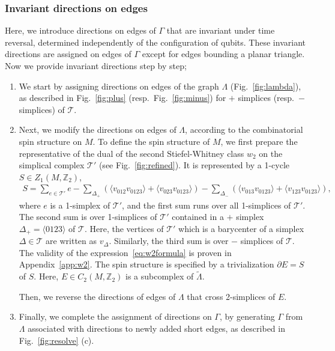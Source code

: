 \documentclass[12pt]{article}
\numberwithin{equation}{section}
\renewcommand{\tilde}{\widetilde}
\begin{document}
\subsubsection{Invariant directions on edges}
\label{sec:invarrow}
Here, we introduce directions on edges of $\Gamma$ that are invariant under time reversal, determined independently of the configuration of qubits. 
These invariant directions are assigned on edges of $\Gamma$ except for edges bounding a planar triangle. Now we provide invariant directions step by step;
\begin{enumerate}
    \item We start by assigning directions on edges of the graph $\Lambda$ (Fig.~\ref{fig:lambda}), as described in Fig.~\ref{fig:plus} (resp.~Fig.~\ref{fig:minus}) for $+$ simplices (resp.~$-$ simplices) of $\mathcal{T}$.
    \item Next, we modify the directions on edges of $\Lambda$, according to the combinatorial spin structure on $M$. To define the spin structure of $M$, we first prepare the representative of the dual of the second Stiefel-Whitney class $w_2$ on the simplical complex $\mathcal{T}'$ (see Fig.~\ref{fig:refined}).
    It is represented by a 1-cycle $S\in Z_1(M,\mathbb{Z}_2)$,
    \begin{align}
    S = \sum_{e\in\mathcal{T}'} e - \sum_{\Delta_+}(\langle v_{012}v_{0123}\rangle + \langle v_{023}v_{0123}\rangle) - \sum_{\Delta_-}(\langle v_{013}v_{0123}\rangle + \langle v_{123}v_{0123}\rangle),
    \label{eq:w2formula}
    \end{align}
    where $e$ is a 1-simplex of $\mathcal{T}'$, and the first sum runs over all 1-simplices of $\mathcal{T}'$. The second sum is over 1-simplices of $\mathcal{T}'$ contained in a $+$ simplex $\Delta_+ = \langle 0123\rangle$ of $\mathcal{T}$.
    Here, the vertices of $\mathcal{T}'$ which is a barycenter of a simplex $\Delta\in\mathcal{T}$ are written as $v_{\Delta}$. Similarly, the third sum is over $-$ simplices of $\mathcal{T}$. The validity of the expression~\eqref{eq:w2formula} is proven in Appendix~\ref{app:w2}.
    The spin structure is specified by a trivialization $\partial E=S$ of $S$. Here, $E\in C_2(M,\mathbb{Z}_2)$ is a subcomplex of $\tilde{\Lambda}$. 
    
    Then, we reverse the directions of edges of $\Lambda$ that cross 2-simplices of $E$.
    
    \item Finally, we complete the assignment of directions on $\Gamma$, by generating $\Gamma$ from $\Lambda$ associated with directions to newly added short edges, as described in Fig.~\ref{fig:resolve} (c). 
\end{enumerate}
\end{document}
